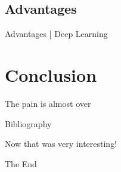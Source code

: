 \documentclass[10pt]{beamer}
\begin{document}
		\subsection{Advantages}
			\begin{frame}{Advantages | Deep Learning}
			\end{frame}
	
	
	
	\section{Conclusion}
		\begin{frame}{The pain is almost over}
		\end{frame}
		\begin{frame}{Bibliography}
		\end{frame}
\endgroup

\begingroup
	\begin{frame}[plain,c]
		\hspace*{10 mm}
		\vspace*{-18 mm}
		\textcolor{blue_light}{\Large{Now that was very interesting!}}
	\end{frame}
	\begin{frame}[plain,c]
		\hspace*{30 mm}
		\vspace*{-20 mm}
		\textcolor{blue_light}{\Large{The End}}
	\end{frame}
\endgroup
\end{document}
